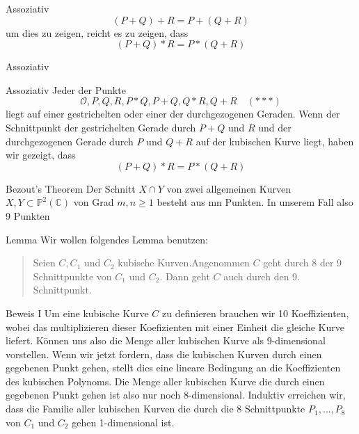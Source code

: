 \documentclass{beamer}
\begin{document}
\begin{frame}{Assoziativ}
\[(P+Q)+R=P+(Q+R)\] um dies zu zeigen, reicht es zu zeigen, dass \[(P+Q)\ast R=P\ast(Q+R)\]
\end{frame}

\begin{frame}{Assoziativ}
\begin{center}
\end{center}
\end{frame}

\begin{frame}{Assoziativ}
    Jeder der Punkte
    \[\mathcal{O},P,Q,R,P\ast Q,P+Q,Q\ast R, Q+R\quad(\ast\ast\ast)\]
    liegt auf einer gestrichelten oder einer der durchgezogenen Geraden. Wenn der Schnittpunkt der gestrichelten Gerade durch \(P+Q\) und \(R\) und der durchgezogenen Gerade durch \(P\) und \(Q+R\) auf der kubischen Kurve liegt, haben wir gezeigt, dass \[(P+Q)\ast R=P\ast(Q+R)\]
\end{frame}

\begin{frame}{Bezout's Theorem}
    Der Schnitt \(X\cap Y\) von zwei allgemeinen Kurven \(X,Y\subset\mathbb{P}^{2}(\mathbb{C})\) von Grad \(m,n\geq1\) besteht aus mn Punkten. In unserem Fall also 9 Punkten
    \begin{center}
    \end{center}
\end{frame}

\begin{frame}{Lemma}
    Wir wollen folgendes Lemma benutzen:\newline
    \begin{quote}
    Seien \(C,C_{1}\) und \(C_{2}\) kubische Kurven.Angenommen \(C\) geht durch 8 der 9 Schnittpunkte von \(C_{1}\) und \(C_{2}\). Dann geht \(C\) auch durch den 9. Schnittpunkt.
    \end{quote}
\end{frame}

\begin{frame}{Beweis I}
    Um eine kubische Kurve \(C\) zu definieren brauchen wir 10 Koeffizienten, wobei das multiplizieren dieser Koefizienten mit einer Einheit die gleiche Kurve liefert. Können uns also die Menge aller kubischen Kurve als 9-dimensional vorstellen. Wenn wir jetzt fordern, dass die kubischen Kurven durch einen gegebenen Punkt gehen, stellt dies eine lineare Bedingung an die Koeffizienten des kubischen Polynoms. Die Menge aller kubischen Kurve die durch einen gegebenen Punkt gehen ist also nur noch 8-dimensional. Induktiv erreichen wir, dass die Familie aller kubischen Kurven die durch die 8 Schnittpunkte \(P_{1},\dots,P_{8}\) von \(C_{1}\) und \(C_{2}\) gehen 1-dimensional ist.
\end{frame}
\end{document}

